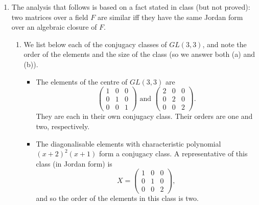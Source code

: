 \documentclass[11pt]{article} \usepackage{amssymb}
\begin{document}
\begin{enumerate}
\begin{enumerate}
  \end{enumerate}
  \item

    The analysis that follows is based on a fact stated in class (but not
    proved): two matrices over a field $F$ are similar iff they have the same
    Jordan form over an algebraic closure of $F$.
    \begin{enumerate}
    \item 
      We list below each of the conjugacy classes of $GL(3,3)$, and note
      the order of the elements and the size of the class (so we answer
      both (a) and (b)).
      \begin{itemize}
      \item The elements of the centre of $GL(3,3)$ are
        \begin{equation*}
          \begin{pmatrix}
            1&0  &0 \\ 
            0&1  &0 \\ 
            0&0  &1 
          \end{pmatrix}
          \mbox{ and }
          \begin{pmatrix}
            2&0  &0 \\ 
            0&2  &0 \\ 
            0&0  &2 
          \end{pmatrix}.
        \end{equation*}
        They are each in their own conjugacy class. Their orders are one
        and two, respectively. 
      \item
        The diagonalisable elements with characteristic polynomial $(x+2)^2(x+1)$
        form a conjugacy class. A representative of this class (in Jordan
        form) is
        \begin{equation*}
          X=
          \begin{pmatrix}
            1&0  &0 \\ 
            0&1  &0 \\ 
            0&0  &2 
          \end{pmatrix},
        \end{equation*}
        and so the order of the elements in this class is two.
        

\end{itemize}
\end{enumerate}
\end{enumerate}
\end{document}
